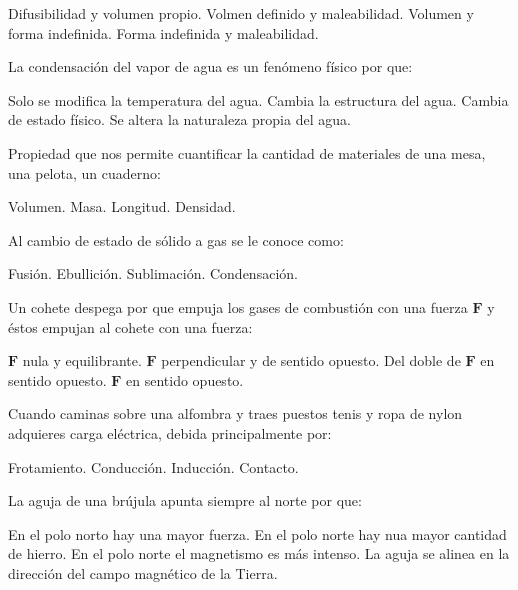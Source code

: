 \documentclass[12pt]{exam}
\begin{document}
\begin{multicols}{2}
\begin{questions}
    \begin{choices}
        \choice Difusibilidad y volumen propio.
        \choice Volmen definido y maleabilidad.
        \choice Volumen y forma indefinida.
        \choice Forma indefinida y maleabilidad.
    \end{choices}
    \question La condensación del vapor de agua es un fenómeno físico por que:
    \begin{choices}
        \choice Solo se modifica la temperatura del agua.
        \choice Cambia la estructura del agua.
        \choice Cambia de estado físico.
        \choice Se altera la naturaleza propia del agua.
    \end{choices}
    \question Propiedad que nos permite cuantificar la cantidad de materiales de una mesa, una pelota, un cuaderno:
    \begin{choices}
        \choice Volumen.
        \choice Masa.
        \choice Longitud.
        \choice Densidad.
    \end{choices}
    \question Al cambio de estado de sólido a gas se le conoce como:
    \begin{choices}
        \choice Fusión.
        \choice Ebullición.
        \choice Sublimación.
        \choice Condensación.
    \end{choices}
    \question Un cohete despega por que empuja los gases de combustión con una fuerza $\mathbf{F}$ y éstos empujan al cohete con una fuerza:
    \begin{choices}
        \choice $\mathbf{F}$ nula y equilibrante.
        \choice $\mathbf{F}$ perpendicular y de sentido opuesto.
        \choice Del doble de $\mathbf{F}$ en sentido opuesto.
        \choice $\mathbf{F}$ en sentido opuesto.
    \end{choices}
    \question Cuando caminas sobre una alfombra y traes puestos tenis y ropa de nylon adquieres carga eléctrica, debida principalmente por:
    \begin{choices}
        \choice Frotamiento.
        \choice Conducción.
        \choice Inducción.
        \choice Contacto.
    \end{choices}
    \question La aguja de una brújula apunta siempre al norte por que:
    \begin{choices}
        \choice En el polo norto hay una mayor fuerza.
        \choice En el polo norte hay nua mayor cantidad de hierro.
        \choice En el polo norte el magnetismo es más intenso.
        \choice La aguja se alinea en la dirección del campo magnético de la Tierra.
    \end{choices}

\end{questions}
\end{multicols}
\end{document}
